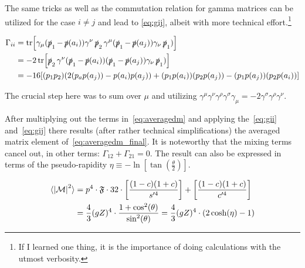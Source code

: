 The same tricks as well as the commutation relation for gamma matrices
can be utilized for the case \(i\neq j\) and lead to \ref{eq:gij},
albeit with more technical effort.\footnote{If I learned one thing, it
  is the importance of doing calculations with the utmost verbosity.}

\begin{equation}
  \label{eq:gij}
  \begin{split}
\Gamma_{ii} &=
\tr[\gamma_\mu(\operatorname{\slashed{p}}_1-\operatorname{\slashed{p}}(a_i))\gamma^\nu\operatorname{\slashed{p}}_2\gamma^\mu(\operatorname{\slashed{p}}_1-\operatorname{\slashed{p}}(a_j))\gamma_\nu\operatorname{\slashed{p}}_1)]\\
&= -2\tr[\operatorname{\slashed{p}}_2\gamma^\nu(\operatorname{\slashed{p}}_1-\operatorname{\slashed{p}}(a_i))(\operatorname{\slashed{p}}_1-\operatorname{\slashed{p}}(a_j))\gamma_\nu\operatorname{\slashed{p}}_1)]
   \\
&=-16\qty[(p_1p_2)(2(p_ap(a_j)) - p(a_i)p(a_j)) +
(p_1p(a_i))(p_2p(a_j)) - (p_1p(a_j))(p_2p(a_i))]
\end{split}
\end{equation}

The crucial step here was to sum over \(\mu\) and utilizing
\(\gamma ^{\mu }\gamma ^{\nu }\gamma ^{\rho }\gamma ^{\sigma }\gamma
_{\mu }=-2\gamma ^{\sigma }\gamma ^{\rho }\gamma ^{\nu }\).


After multiplying out the terms in~\eqref{eq:averagedm} and applying
the~\eqref{eq:gii} and~\eqref{eq:gij} there results (after rather
technical simplifications) the averaged matrix element
of~\eqref{eq:averagedm_final}. It is noteworthy that the mixing terms
cancel out, in other terms: \(\Gamma_{12} + \Gamma_{21} = 0\). The
result can also be expressed in terms of the pseudo-rapidity
\(\eta \equiv -\ln[\tan(\frac{\theta}{2})]\).

\begin{equation}
  \label{eq:averagedm_final}
  \begin{split}
  \langle\abs{\mathcal{M}}^2\rangle &= p^4\cdot\mathfrak{F}\cdot
  32\cdot\qty[\frac{(1-c)(1+c)}{s'^4}] + \qty[\frac{(1-c)(1+c)}{c'^4}] \\
  &= \frac{4}{3}(gZ)^4 \cdot\frac{1+\cos^2(\theta)}{\sin^2(\theta)} =
  \frac{4}{3}(gZ)^4\cdot(2\cosh(\eta) - 1)
  \end{split}
\end{equation}
